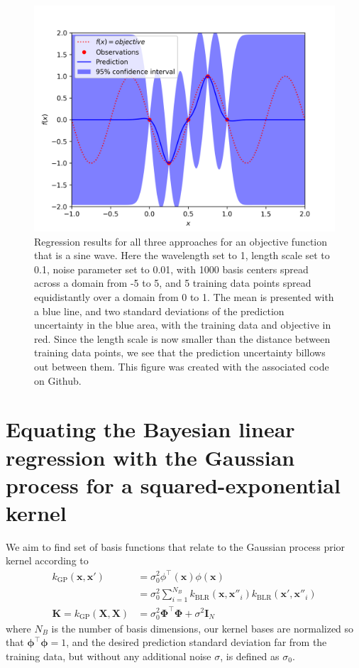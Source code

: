 \documentclass{article}
\begin{document}
\begin{figure}
    \begin{center}
    \includegraphics[width=0.75\linewidth]{regression_results2}
    \caption{
     Regression results for all three approaches for an objective function that is a sine wave. Here the wavelength set to 1, length scale set to 0.1, noise parameter set to 0.01, with 1000 basis centers spread across a domain from -5 to 5, and 5 training data points spread equidistantly over a domain from 0 to 1. The mean is presented with a blue line, and two standard deviations of the prediction uncertainty in the blue area, with the training data and objective in red. Since the length scale is now smaller than the distance between training data points, we see that the prediction uncertainty billows out between them. This figure was created with the associated code on Github.}
    \label{fig:example_regression2}
    \end{center}
\end{figure}

\section{Equating the Bayesian linear regression with the Gaussian process for a squared-exponential kernel}

We aim to find set of basis functions that relate to the Gaussian process prior kernel according to 
\begin{equation}
\label{define_K}
\begin{split}
     k_\text{GP}(\mathbf{x},\mathbf{x}') &= \sigma_0^2\phi^\top(\mathbf{x})\phi(\mathbf{x}) \\& = \sigma_0^2\sum_{i=1}^{N_B}k_\text{BLR}(\mathbf{x},\mathbf{x}''_i)k_\text{BLR}(\mathbf{x'},\mathbf{x}''_i) \\
     \mathbf{K}=k_{\text{GP}}(\mathbf{X},\mathbf{X})& = \sigma_0^2\boldsymbol{\Phi}^\top \boldsymbol{\Phi} + \sigma^2\mathbf{I}_N
     \end{split}
\end{equation}
where $N_B$ is the number of basis dimensions, our kernel bases are normalized so that $\boldsymbol{\phi}^\top\boldsymbol{\phi}=1$, and the desired prediction standard deviation far from the training data, but without any additional noise $\sigma$, is defined as $\sigma_0$. 
\end{document}

